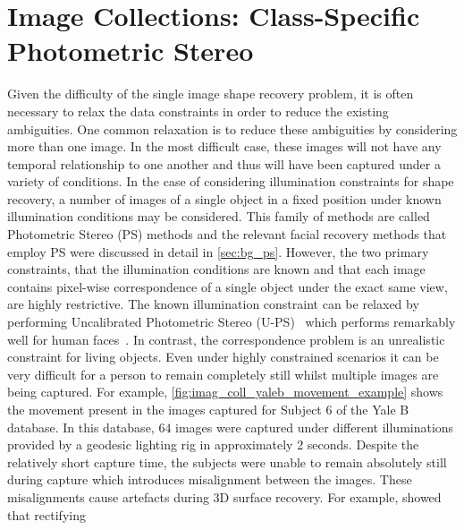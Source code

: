 \chapter{Image Collections: Class-Specific Photometric Stereo}\label{ch:imag_coll}
\minitoc{}
Given the difficulty of the single image shape recovery problem, it is
often necessary to relax the data constraints in order to reduce the 
existing ambiguities. One common relaxation is to reduce these
ambiguities by considering more than one image. In the most difficult case,
these images will not have any temporal relationship to one another and thus
will have been captured under a variety of conditions. In the case of
considering illumination constraints for shape recovery, a number of images
of a single object in a fixed position under known illumination conditions
may be considered. This family of methods are called Photometric Stereo (PS)
methods and the relevant facial recovery methods that employ PS were discussed
in detail in \cref{sec:bg_ps}.
However, the two primary constraints, that the illumination conditions are known
and that each image contains pixel-wise correspondence of a single object under
the exact same view, are highly restrictive. The known illumination constraint
can be relaxed by performing
Uncalibrated Photometric Stereo (U-PS)~\cite{hayakawa1994photometric,%
basri2007photometric} which performs remarkably well for
human faces~\cite{KemelmacherShlizerman:2013iv,kemelmacher2011face,%
kemelmacher2012collection}. In contrast, the correspondence problem is an
unrealistic constraint for living objects. Even under highly constrained
scenarios it can be very difficult for a person to remain completely still
whilst multiple images are being captured.
For example, \cref{fig:imag_coll_yaleb_movement_example} shows the movement
present in the images captured for Subject 6 of the
Yale B~\cite{georghiades2001fromfew} database. In this database, $64$ images
were captured under different illuminations provided by a geodesic lighting rig in
approximately 2 seconds. Despite the relatively short capture time, the subjects
were unable to remain absolutely still during capture which introduces
misalignment between the images. These misalignments cause artefacts
during 3D surface recovery.
For example, \citet{harrison2012translational} showed that rectifying
